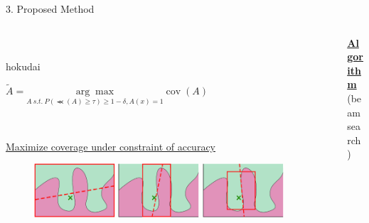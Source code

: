\documentclass[unicode]{beamer}
\begin{document}
\begin{frame}
\begin{columns}[t]
\begin{column}{\rcol\textwidth}
\begin{block}{3. Proposed Method}
\begin{columns}[t]
\begin{column}{\lcol\textwidth}
\begin{columns}
\begin{column}{0.95\textwidth}
                \vspace{0.2em}
                \begin{center}~%
                  \begin{beamercolorbox}[wd=.85\textwidth,colsep=0.1cm,rounded=true,shadow=true]{hokudai}
                    \begin{center}
                      $
                        \tilde{A}=\underset{A\ s.t.
                          \ P(\Prec(A)\ge\tau)\ge1-\delta,A(x)=1}  %
                        {\arg\max}\operatorname{cov}(A)  %
                      $
                    \end{center}~%
                  \end{beamercolorbox}

                  \vspace{0.5em}
                  \underline{Maximize coverage under constraint of accuracy}
                \end{center}
                \vspace{0.8em}
                \begin{figure}[t]
                  \centering
                  \includegraphics[width=0.3\textwidth]{src/img/visual-rlime1}
                  \includegraphics[width=0.3\textwidth]{src/img/visual-rlime2}
                  \includegraphics[width=0.3\textwidth]{src/img/visual-rlime3}
                \end{figure}
              \end{column}
            \end{columns}
          \end{column}
          \begin{column}{\rcol\textwidth}
            \hspace{-1.0em}
            \underline{\textbf{Algorithm}} (beam search)


\end{column}
\end{columns}
\end{block}
\end{column}
\end{columns}
\end{frame}
\end{document}
